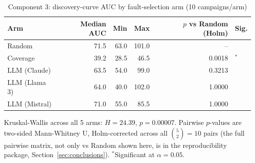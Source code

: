 \begin{table}[ht]
\centering
\caption{Component 3: discovery-curve AUC by fault-selection arm (10 campaigns/arm)}
\label{tab:component3}
\small
\begin{tabular}{lrrrrl}
\hline
\textbf{Arm} & \textbf{Median AUC} & \textbf{Min} & \textbf{Max} & \textbf{$p$ vs Random (Holm)} & \textbf{Sig.} \\
\hline
Random & 71.5 & 63.0 & 101.0 & -- &  \\
Coverage & 39.2 & 28.5 & 46.5 & 0.0018 & $^*$ \\
LLM (Claude) & 63.5 & 54.0 & 99.0 & 0.3213 &  \\
LLM (Llama 3) & 64.0 & 40.0 & 102.0 & 1.0000 &  \\
LLM (Mistral) & 71.0 & 55.0 & 85.5 & 1.0000 &  \\
\hline
\end{tabular}
\vspace{2mm}
\raggedright\footnotesize Kruskal-Wallis across all 5 arms: $H=24.39$, $p=0.00007$. Pairwise $p$-values are two-sided Mann-Whitney U, Holm-corrected across all $\binom{5}{2}=10$ pairs (the full pairwise matrix, not only vs Random shown here, is in the reproducibility package, Section~\ref{sec:conclusions}). $^*$Significant at $\alpha=0.05$.
\end{table}